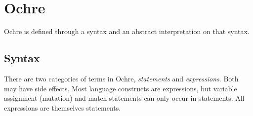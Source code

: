 \documentclass[12pt,twoside]{report}
\begin{document}

\cleardoublepage
\chapter{Ochre}
\label{chapter:definition}

Ochre is defined through a syntax and an abstract interpretation on that syntax.

\section{Syntax}
There are two categories of terms in Ochre, \textit{statements} and \textit{expressions}. Both may have side effects. Most language constructs are expressions, but variable assignment (mutation) and match statements can only occur in statements. All expressions are themselves statements.
\end{document}

